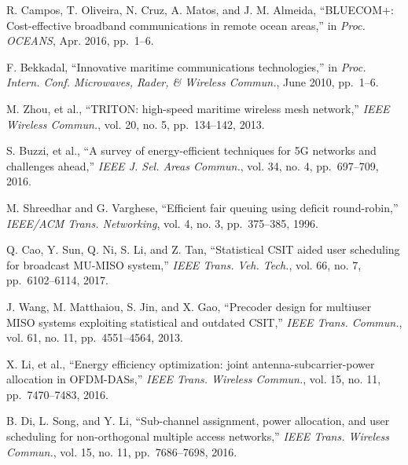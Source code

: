 \documentclass[conference]{IEEEtran}
\begin{document}
\begin{thebibliography}{10}
  
  
  
  R. Campos, T. Oliveira, N. Cruz, A. Matos, and J. M. Almeida,
  ``BLUECOM+: Cost-effective broadband communications in remote ocean areas,'' in
  \emph{Proc. OCEANS}, Apr. 2016, pp.~1--6.
  
  F. Bekkadal, ``Innovative maritime communications technologies,'' in
  \emph{Proc. Intern. Conf. Microwaves, Rader, \& Wireless Commun.}, June 2010, pp.~1--6.
  
  M. Zhou, et al., ``TRITON: high-speed maritime wireless mesh network,''
  \emph{IEEE Wireless Commun.}, vol. 20, no. 5, pp.~134--142, 2013.
  
  
  S. Buzzi, et al., ``A survey of energy-efficient techniques for 5G networks and challenges ahead,''
  \emph{IEEE J. Sel. Areas Commun.}, vol. 34, no. 4, pp.~697--709, 2016.
  
  M. Shreedhar and G. Varghese, ``Efficient fair queuing using deficit round-robin,''
  \emph{IEEE/ACM Trans. Networking}, vol. 4, no. 3, pp.~375--385, 1996.
  
  Q. Cao, Y. Sun, Q. Ni, S. Li, and Z. Tan, ``Statistical CSIT aided user scheduling for broadcast MU-MISO system,''
  \emph{IEEE Trans. Veh. Tech.}, vol. 66, no. 7, pp.~6102--6114, 2017.
  
  J. Wang, M. Matthaiou, S. Jin, and X. Gao, ``Precoder design for multiuser MISO systems exploiting statistical and outdated CSIT,''
  \emph{IEEE Trans. Commun.}, vol. 61, no. 11, pp.~4551--4564, 2013.
  
  X. Li, et al., ``Energy efficiency optimization: joint antenna-subcarrier-power allocation in OFDM-DASs,''
  \emph{IEEE Trans. Wireless Commun.}, vol. 15, no. 11, pp.~7470--7483, 2016.
  
  B. Di, L. Song, and Y. Li, ``Sub-channel assignment, power allocation, and user scheduling for non-orthogonal multiple access networks,''
  \emph{IEEE Trans. Wireless Commun.}, vol. 15, no. 11, pp.~7686--7698, 2016.
  

\end{thebibliography}
\end{document}

